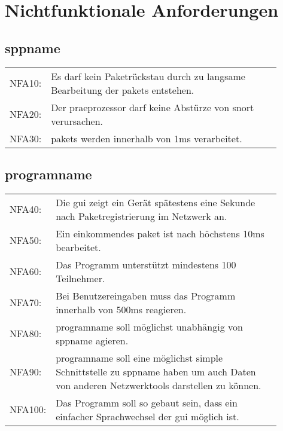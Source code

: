 \chapter{Nichtfunktionale Anforderungen}

\section{\gls{sppname}}
\begin{tabular}{lp{0.9\linewidth}}
NFA10: & Es darf kein Paketrückstau durch zu langsame Bearbeitung der \glspl{paket} entstehen. \\

NFA20: & Der \gls{praeprozessor} darf keine Abstürze von \gls{snort} verursachen. \\

NFA30: & \glspl{paket} werden innerhalb von 1ms verarbeitet.
\end{tabular}
\section{\gls{programname}}
\begin{tabular}{lp{0.9\linewidth}}
NFA40: & Die \gls{gui} zeigt ein Gerät spätestens eine Sekunde nach Paketregistrierung im Netzwerk an. \\

NFA50: & Ein einkommendes \gls{paket} ist nach höchstens 10ms bearbeitet. \\

NFA60: & Das Programm unterstützt mindestens 100 Teilnehmer. \\

NFA70: & Bei Benutzereingaben muss das Programm innerhalb von 500ms reagieren. \\

NFA80: & \gls{programname} soll möglichst unabhängig von \gls{sppname} agieren. \\

NFA90: & \gls{programname} soll eine möglichst simple Schnittstelle zu \gls{sppname} haben um auch Daten von anderen Netzwerktools darstellen zu können. \\

NFA100: & Das Programm soll so gebaut sein, dass ein einfacher Sprachwechsel der \gls{gui} möglich ist. \\
\end{tabular}
